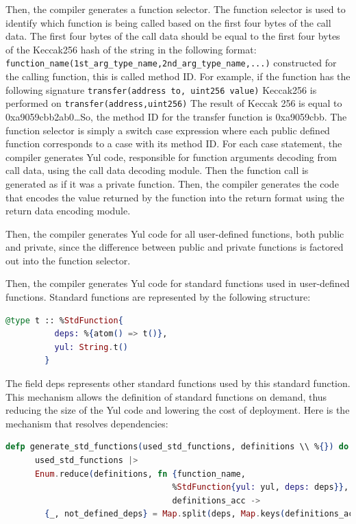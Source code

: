 \begin{itemize}
    Then, the compiler generates a function selector. The function selector is used to identify which function is being called based on the first four bytes of the call data. The first four bytes of the call data should be equal to the first four bytes of the Keccak256 hash of the string in the following format:
    \lstinline|function_name(1st_arg_type_name,2nd_arg_type_name,...)|
    constructed for the calling function, this is called method ID. For example, if the function has the following signature 
    \lstinline|transfer(address to, uint256 value)|
    Keccak256 is performed on 
    \lstinline|transfer(address,uint256)| The result of Keccak 256 is equal to 0xa9059cbb2ab0\dots So, the method ID for the transfer function is 0xa9059cbb. The function selector is simply a switch case expression where each public defined function corresponds to a case with its method ID. For each case statement, the compiler generates Yul code, responsible for function arguments decoding from call data, using the call data decoding module. Then the function call is generated as if it was a private function. Then, the compiler generates the code that encodes the value returned by the function into the return format using the return data encoding module.

    Then, the compiler generates Yul code for all user-defined functions, both public and private, since the difference between public and private functions is factored out into the function selector.

    Then, the compiler generates Yul code for standard functions used in user-defined functions. Standard functions are represented by the following structure:

    \begin{lstlisting}[caption={Standard function structure}, language=elixir, label={lst:standard_function_structure}]
      @type t :: %StdFunction{
          deps: %{atom() => t()},
          yul: String.t()
        }
    \end{lstlisting}

    The field deps represents other standard functions used by this standard function. This mechanism allows the definition of standard functions on demand, thus reducing the size of the Yul code and lowering the cost of deployment. Here is the mechanism that resolves dependencies:


    \begin{lstlisting}[caption={Standard function dependencies}, language=elixir, label={lst:standard_function_dependencies}]
    defp generate_std_functions(used_std_functions, definitions \\ %{}) do
      used_std_functions |>
      Enum.reduce(definitions, fn {function_name,
                                  %StdFunction{yul: yul, deps: deps}},
                                  definitions_acc ->
        {_, not_defined_deps} = Map.split(deps, Map.keys(definitions_acc))


\end{lstlisting}
\end{itemize}
